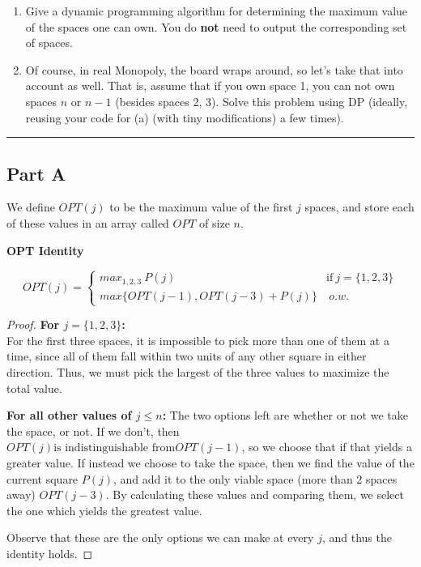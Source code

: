\documentclass[11pt]{article}
\begin{document}
\begin{enumerate}[label=(\Alph*)]
\item Give a dynamic programming algorithm for determining the maximum value of the spaces one can own. You do \textbf{not} need to output the corresponding set of spaces.
\item Of course, in real Monopoly, the board wraps around, so let's take that into account as well. That is, assume that if you own space 1, you can not own spaces $n$ or $n - 1$ (besides spaces 2, 3). Solve this problem using DP (ideally, reusing your code for (a) (with tiny modifications) a few times).
\end{enumerate}

\noindent\rule{17cm}{0.4pt}

\subsection*{Part A}
We define $OPT(j)$ to be the maximum value of the first $j$ spaces, and store each of these values in an array called $OPT$ of size $n$. 

\textbf{OPT Identity}

\begin{equation}
	OPT(j) = 
	\begin{cases}
	max_{1, 2, 3} \ P(j) & \text{if} \ j = \{1, 2, 3\}\\
	max\{OPT(j-1), OPT(j-3) + P(j)\} & \ o.w.
	\end{cases}
\end{equation}

\begin{proof}
	\textbf{For $j = \{1, 2, 3\}$:}\\
	For the first three spaces, it is impossible to pick more than one of them at a time, since all of them fall within two units of any other square in either direction. Thus, we must pick the largest of the three values to maximize the total value.
	
	\textbf{For all other values of $j \leq n$:}
	The two options left are whether or not we take the space, or not. If we don't, then $OPT(j) \text{is indistinguishable from} OPT(j-1)$, so we choose that if that yields a greater value. If instead we choose to take the space, then we find the value of the current square $P(j)$, and add it to the only viable space (more than 2 spaces away) $OPT(j-3)$. By calculating these values and comparing them, we select the one which yields the greatest value.
	
	Observe that these are the only options we can make at every $j$, and thus the identity holds.
\end{proof}
\end{document}
